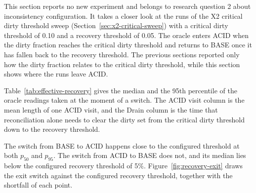 This section reports no new experiment and belongs to research question 2 about
inconsistency configuration. It takes a closer look at the runs of the X2
critical dirty threshold sweep (Section~\ref{sec:x2-critical-sweep}) with a
critical dirty threshold of 0.10 and a recovery threshold of 0.05. The oracle
enters ACID when the dirty fraction reaches the critical dirty threshold and
returns to BASE once it has fallen back to the recovery threshold. The previous
sections reported only how the dirty fraction relates to the critical dirty
threshold, while this section shows where the runs leave ACID.


Table~\ref{tab:effective-recovery} gives the median and the 95th percentile of
the oracle readings taken at the moment of a switch. The ACID visit column is
the mean length of one ACID visit, and the Drain column is the time that
reconciliation alone needs to clear the dirty set from the critical dirty
threshold down to the recovery threshold.

The switch from BASE to ACID happens close to the configured threshold at both
$p_{50}$ and $p_{95}$. The switch from ACID to BASE does not, and its median
lies below the configured recovery threshold of 5\%. Figure~\ref{fig:recovery-exit}
draws the exit switch against the configured recovery threshold, together with
the shortfall of each point.

